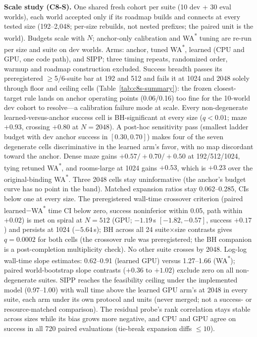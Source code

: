 \documentclass[letterpaper]{article} %
\begin{document}
\textbf{Scale study (C8-S).} One shared fresh cohort per suite (10 dev +
30 eval worlds), each world accepted only if its roadmap builds and connects at every tested size (192--2{,}048; per-size rebuilds,
not nested prefixes; the paired unit is the world). Budgets scale with $N$; anchor-only calibration and WA\textsuperscript{*} tuning are re-run per size and suite on dev worlds. Arms: anchor, tuned WA\textsuperscript{*}, learned (CPU and GPU, one code path), and SIPP; three timing repeats, randomized order, warmup and roadmap construction excluded. Success breadth passes its preregistered $\geq$5/6-suite bar at 192 and 512 and fails it at 1024 and
2048 solely through floor and ceiling cells (Table~\ref{tab:c8s-summary}): the frozen closest-target rule lands on anchor operating points (0.06/0.16) too fine for the 10-world dev cohort to resolve---a calibration failure mode at scale. Every non-degenerate learned-versus-anchor success cell is BH-significant at every size ($q<0.01$; maze $+0.93$, crossing $+0.80$ at $N{=}2048$). A post-hoc sensitivity pass (smallest ladder budget with dev anchor success in $[0.30, 0.70]$) makes four of the seven degenerate cells discriminative in the learned arm's favor, with no map discordant toward the anchor. Dense maze gains $+0.57/+0.70/+0.50$ at 192/512/1024, tying retuned WA\textsuperscript{*}, and rooms-large at 1024 gains $+0.53$, which is $+0.23$ over the original-binding WA\textsuperscript{*}. Three 2048 cells stay uninformative (the anchor's budget curve has no point in the band). Matched expansion ratios stay 0.062--0.285, CIs below one at every size. The preregistered wall-time crossover criterion (paired
learned$-$WA\textsuperscript{*} time CI below zero, success noninferior
within 0.05, path within $+0.02$) is met on spiral at $N{=}512$ (GPU;
$-1.19$\,s $[-1.82,-0.57]$, success $+0.17$) and persists at 1024
($-5.64$\,s); BH across all 24 suite$\times$size contrasts gives
$q{=}0.0002$ for both cells (the crossover rule was preregistered; the BH companion is a post-completion multiplicity check). No other suite crosses by 2048. Log-log wall-time slope estimates: 0.62--0.91 (learned GPU) versus 1.27--1.66
(WA\textsuperscript{*}); paired world-bootstrap slope contrasts ($+0.36$ to $+1.02$) exclude zero on all non-degenerate suites. SIPP reaches the feasibility ceiling under the implemented model
(0.97--1.00) with wall time above the learned GPU arm's at 2048 in every suite, each arm under its own protocol and units (never merged; not a success- or resource-matched comparison). The residual probe's rank correlation stays stable across sizes while its bias grows more negative, and CPU and GPU agree on success in all 720 paired evaluations (tie-break expansion
diffs $\leq 10$).
\end{document}
